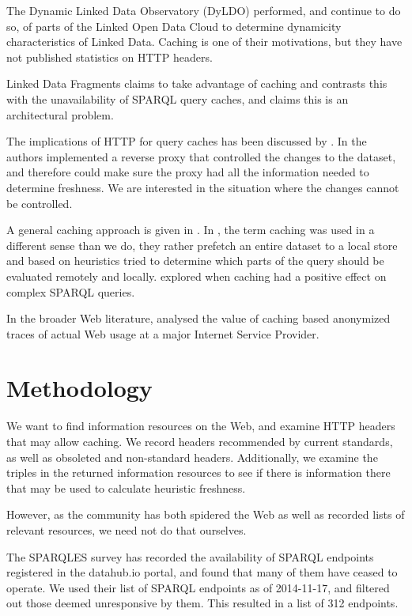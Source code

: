 \documentclass{llncs}
\begin{document}
The \cite{dyldo2} Dynamic Linked Data Observatory (DyLDO)
performed, and continue to do so, of parts of the Linked Open Data
Cloud to determine dynamicity characteristics of Linked Data. Caching
is one of their motivations, but they have not published statistics on
HTTP headers.

Linked Data Fragments \cite{ldf1} claims to take advantage of caching
and contrasts this with the unavailability of SPARQL query caches, and
claims this is an architectural problem.

The implications of HTTP for query caches has been discussed by
\cite{kaseicache}. In \cite{sparqlproxy} the authors implemented a
reverse proxy that controlled the changes to the dataset, and
therefore could make sure the proxy had all the information needed to
determine freshness. We are interested in the situation where the
changes cannot be controlled.

A general caching approach is given in \cite{yang2011caching}.  In
\cite{umbrich2012hybrid}, the term caching was used in a different
sense than we do, they rather prefetch an entire dataset to a local
store and based on heuristics tried to determine which parts of the
query should be evaluated remotely and locally. \cite{lampo2011cache}
explored when caching had a positive effect on complex SPARQL queries.

In the broader Web literature, \cite{ager2010revisiting} analysed the
value of caching based anonymized traces of actual Web usage at a
major Internet Service Provider.

\section{Methodology}

We want to find information resources on the Web, and examine HTTP
headers that may allow caching. We record headers recommended by
current standards, as well as obsoleted and non-standard
headers. Additionally, we examine the triples in the returned
information resources to see if there is information there that may be
used to calculate heuristic freshness.

However, as the community has both spidered the Web as well as
recorded lists of relevant resources, we need not do that ourselves. 

The SPARQLES survey\cite{buil2013sparql} has recorded the availability
of SPARQL endpoints registered in the datahub.io portal, and found
that many of them have ceased to operate. We used their list of SPARQL
endpoints as of 2014-11-17, and filtered out those deemed unresponsive
by them. This resulted in a list of 312 endpoints.
\end{document}
